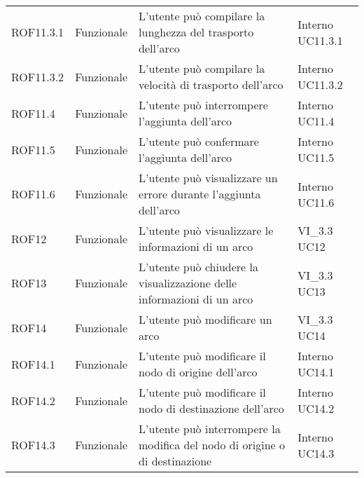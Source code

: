 \begin{longtable}{p{2cm}!{\VRule[1pt]}p{2cm}!{\VRule[1pt]}p{5cm}!{\VRule[1pt]}p{1.5cm}}
 \\
ROF11.3.1&Funzionale\newline  & L'utente può compilare la lunghezza del trasporto dell'arco & Interno \newline UC11.3.1
 \\
ROF11.3.2&Funzionale\newline  & L'utente può compilare la velocità di trasporto dell'arco & Interno \newline UC11.3.2
 \\
ROF11.4&Funzionale\newline  & L'utente può interrompere l'aggiunta dell'arco & Interno \newline UC11.4
 \\
ROF11.5&Funzionale\newline  & L'utente può confermare l'aggiunta dell'arco & Interno \newline UC11.5
 \\
ROF11.6&Funzionale\newline  & L'utente può visualizzare un errore durante l'aggiunta dell'arco & Interno \newline UC11.6
 \\
ROF12&Funzionale\newline  & L'utente può visualizzare le informazioni di un arco & VI_3.3 \newline UC12
 \\
ROF13&Funzionale\newline  & L'utente può chiudere la visualizzazione delle informazioni di un arco & VI_3.3 \newline UC13
 \\
ROF14&Funzionale\newline  & L'utente può modificare un arco & VI_3.3 \newline UC14
 \\
ROF14.1&Funzionale\newline  & L'utente può modificare il nodo di origine dell'arco & Interno \newline UC14.1
 \\
ROF14.2&Funzionale\newline  & L'utente può modificare il nodo di destinazione dell'arco & Interno \newline UC14.2
 \\
ROF14.3&Funzionale\newline  & L'utente può interrompere la modifica del nodo di origine o di destinazione & Interno \newline UC14.3
 \\

\end{longtable}
